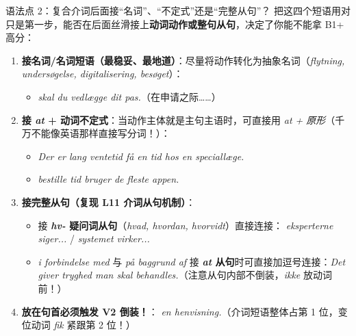 \begin{grammatikbox}{语法点 2：复合介词后面接“名词”、“不定式”还是“完整从句”？}
把这四个短语用对只是第一步，能否在后面丝滑接上\textbf{动词动作或整句从句}，决定了你能不能拿 B1+ 高分：
\begin{enumerate}
  \item \textbf{接名词/名词短语（最稳妥、最地道）}：尽量将动作转化为抽象名词（\textit{flytning, undersøgelse, digitalisering, besøget}）：
    \begin{itemize}
      \item \textit{  skal du vedlægge dit pas.}（在申请之际……）
    \end{itemize}
  \item \textbf{接 \textit{at} + 动词不定式}：当动作主体就是主句主语时，可直接用 \textit{at + 原形}（千万不能像英语那样直接写分词！）：
    \begin{itemize}
      \item \textit{Der er lang ventetid  få en tid hos en speciallæge.}
      \item \textit{ bestille tid bruger de fleste appen.}
    \end{itemize}
  \item \textbf{接完整从句（复现 L11 介词从句机制）}：
    \begin{itemize}
      \item 接 \textbf{\textit{hv-} 疑问词从句}（\textit{hvad, hvordan, hvorvidt}）直接连接：\textit{ eksperterne siger...} / \textit{ systemet virker...}
      \item \textit{i forbindelse med} 与 \textit{på baggrund af} 接 \textbf{\textit{at} 从句}时可直接加逗号连接：\textit{Det giver tryghed  man skal behandles.}（注意从句内部不倒装，\textit{ikke} 放动词前！）
    \end{itemize}
  \item \textbf{放在句首必须触发 V2 倒装！}：\textit{  en henvisning.}（介词短语整体占第 1 位，变位动词 \textit{fik} 紧跟第 2 位！）
\end{enumerate}
\end{grammatikbox}

